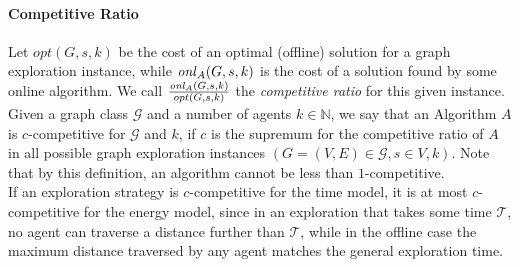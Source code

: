 \paragraph*{Competitive Ratio} Let $opt(G,s,k)$ be the cost of an optimal (offline) solution
for a graph exploration instance, while $\mathop{\mathit{onl}}\nolimits_{A}(G,s,k)$ is the cost of a solution found by some online algorithm. We call $\frac{\mathop{\mathit{onl}}\nolimits_{A}(G,s,k)}{opt(G,s,k)}$ the \textit{competitive ratio}
for this given instance. Given a graph class $\mathcal{G}$ and a number of agents $k \in \mathbb{N}$, we say that an Algorithm $A$ is $c$-competitive for $\mathcal{G}$ and $k$, if $c$ is the supremum for
the competitive ratio of $A$ in all possible graph exploration instances $(G =(V,E) \in \mathcal{G}, s \in V, k)$. Note that by this definition, an algorithm cannot be less than $1$-competitive.\\
If an exploration strategy is
$c$-competitive for the time model, it is at most $c$-competitive for the energy model, since in an exploration that takes some time $\mathcal{T}$, no agent can traverse a distance further than $\mathcal{T}$,
while in the offline case the maximum distance traversed by any agent matches the general exploration time.